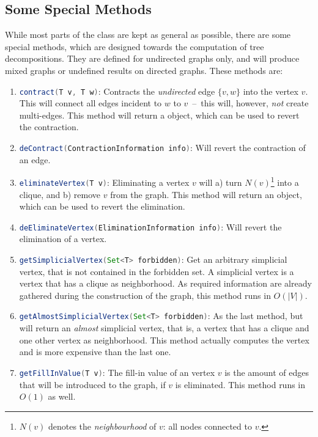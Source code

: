 \documentclass[a4paper, ukenglish, twoside, openright]{jdrasilmanual}
\begin{document}
\subsection{Some Special Methods}
While most parts of the  class are kept as general as
possible, there are some special methods, which are designed towards
the computation of tree decompositions. They are defined for
\textcolor{jdrasil.fg}{undirected graphs} only, and will produce
mixed graphs or undefined results on directed graphs. These methods
are:
\begin{enumerate}
  \item\lstinline[language=Java]{contract(T v, T w)}: Contracts the
    \emph{undirected} edge $\{v,w\}$ into the vertex $v$. This will
    connect all edges incident to $w$ to $v$~–~this will, however,
    \emph{not} create multi-edges. This method will return a
     object, which can be used to
    revert the contraction.
 \item\lstinline[language=Java]{deContract(ContractionInformation info)}: Will revert the contraction of an edge.
  \item\lstinline[language=Java]{eliminateVertex(T v)}: Eliminating
    a vertex $v$ will a) turn $N(v)$\footnote{$N(v)$ denotes the
      \emph{neighbourhood} of $v$: all nodes connected to $v$.} into a clique, and b) remove $v$
    from the graph. This method will return an
     object, which can be used to
    revert the elimination.
  \item\lstinline[language=Java]{deEliminateVertex(EliminationInformation info)}:
 Will revert the elimination of a vertex.
 \item\lstinline[language=Java]{getSimplicialVertex(Set<T> forbidden)}: Get an arbitrary simplicial vertex, that is not
   contained in the forbidden set. A simplicial vertex is a vertex that has a
   clique as neighborhood. As required information are already
   gathered during the construction of the graph, this method runs in
   $O(|V|)$.
 \item\lstinline[language=Java]{getAlmostSimplicialVertex(Set<T> forbidden)}: As the last method, but will return an \emph{almost}
   simplicial vertex, that is, a vertex that has a clique and one other
   vertex as neighborhood. This method actually computes the vertex
   and is more expensive than the last one.
 \item\lstinline[language=Java]{getFillInValue(T v)}: The fill-in
   value of an vertex $v$ is the amount of edges that will be
   introduced to the graph, if $v$ is eliminated. This method runs in
   $O(1)$ as well.
\end{enumerate}
\end{document}
